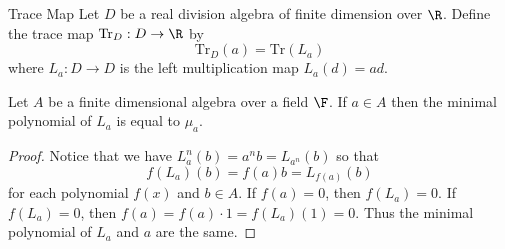 \documentclass[a4paper]{article}
\begin{document}
\begin{defn}{Trace Map}{} Let $D$ be a real division algebra of finite dimension over $\R$. Define the trace map $\text{Tr}_D:D\to\R$ by $$\text{Tr}_D(a)=\text{Tr}(L_a)$$ where $L_a:D\to D$ is the left multiplication map $L_a(d)=ad$. 
\end{defn}

\begin{lmm}{}{} Let $A$ be a finite dimensional algebra over a field $\F$. If $a\in A$ then the minimal polynomial of $L_a$ is equal to $\mu_a$. 
\begin{proof}
Notice that we have $L_a^n(b)=a^nb=L_{a^n}(b)$ so that $$f(L_a)(b)=f(a)b=L_{f(a)}(b)$$ for each polynomial $f(x)$ and $b\in A$. If $f(a)=0$, then $f(L_a)=0$. If $f(L_a)=0$, then $f(a)=f(a)\cdot 1=f(L_a)(1)=0$. Thus the minimal polynomial of $L_a$ and $a$ are the same. 
\end{proof}
\end{lmm}
\end{document}
